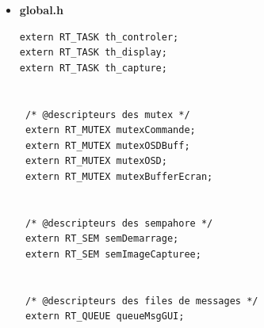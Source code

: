 \documentclass[11pt, a4paper]{paper}
\begin{document}
\begin{itemize}
\begin{lstlisting}
        jpegimage = d_new_jpegimage();
        d_jpegimage_compress(jpegimage,frame);
        message = d_new_message();
        d_message_put_jpeg_image(message,jpegimage);

        rt_printf("th_capture  : Envoie de l'image capturee \n");
        if (write_in_queue(&queueMsgGUI, message, sizeof (DMessage)) < 0) {message->free(message);}

    }
}


void th_display (void *arg)
{

  DImage *image_capturee;
  DMessage *message;
  DJpegimage *jpegimage;


  rt_printf ("th_display :  en attente de demarrage\n");
  rt_sem_p(&semDemarrage, TM_INFINITE);

  rt_printf("th_display : Demarrage Succes\n");


  while (1)
    {
        rt_sem_p(&semImageCapturee, TM_INFINITE); //synchronisation avec le thread th_capture, image_capturee ?

        if ((err = rt_queue_read (&queueMsgGUI, &image_capturee, sizeof (DMessage), TM_INFINITE)) >= 0) {

            rt_mutex_acquire (&mutexOSD, TM_INFINITE); //osd_var := Read_data(osd)
            osd_var = osd;
            rt_mutex_release (&mutexOSD);

            img = encode(image_capturee, osd_var);

            rt_mutex_acquire (&mutexBufferEcran, TM_INFINITE); //osd_var := Read_data(osd)
            buffer_ecran = img;
            rt_mutex_release (&mutexBufferEcran);
      }
      else  {rt_printf ("th_display : Error msg queue write: %s\n", strerror (-err));}

    }
}

\end{lstlisting}

\item \large{\bf global.h}

\lstset{language=C} 
\begin{lstlisting}
extern RT_TASK th_controler;
extern RT_TASK th_display;
extern RT_TASK th_capture;


 /* @descripteurs des mutex */
 extern RT_MUTEX mutexCommande;
 extern RT_MUTEX mutexOSDBuff;
 extern RT_MUTEX mutexOSD;
 extern RT_MUTEX mutexBufferEcran;


 /* @descripteurs des sempahore */
 extern RT_SEM semDemarrage;
 extern RT_SEM semImageCapturee;


 /* @descripteurs des files de messages */
 extern RT_QUEUE queueMsgGUI;



\end{lstlisting}
\end{itemize}
\end{document}
